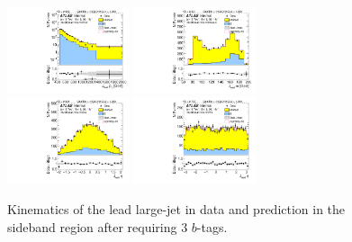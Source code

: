 \clearpage

\begin{figure}[htbp!]
\begin{center}
\includegraphics[width=0.32\textwidth,angle=-90]{figures/boosted/Sideband/b77_ThreeTag_Sideband_leadHCand_Pt_m_1.pdf}
\includegraphics[width=0.32\textwidth,angle=-90]{figures/boosted/Sideband/b77_ThreeTag_Sideband_leadHCand_Mass_s.pdf}\\
\includegraphics[width=0.32\textwidth,angle=-90]{figures/boosted/Sideband/b77_ThreeTag_Sideband_leadHCand_Eta.pdf}
\includegraphics[width=0.32\textwidth,angle=-90]{figures/boosted/Sideband/b77_ThreeTag_Sideband_leadHCand_Phi.pdf}
  \caption{Kinematics of the lead large-\R jet in data and prediction in the sideband region after requiring 3 $b$-tags.}
  \label{fig:boosted-3b-sideband-ak10-lead}
\end{center}
\end{figure}

